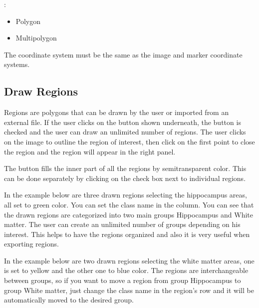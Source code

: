 \documentclass[letterpaper,10pt,english,openany,oneside]{sphinxmanual}
\begin{document}
\sphinxAtStartPar
{}:
\begin{itemize}
\item {} 
\sphinxAtStartPar
Polygon

\item {} 
\sphinxAtStartPar
Multipolygon

\end{itemize}

\sphinxAtStartPar
The coordinate system must be the same as the image and marker coordinate systems.


\subsection{Draw Regions}
\label{\detokenize{docs/starting/regions:draw-regions}}
\sphinxAtStartPar
Regions are polygons that can be drawn by the user or imported from an external file. If the user clicks on the button  shown underneath, the button is checked and the user can draw an unlimited number of regions. The user clicks on the image to outline the region of interest, then click on the first point to close the region and the region will appear in the right panel.

\sphinxAtStartPar
The button  fills the inner part of all the regions by semitransparent color. This can be done separately by clicking on the check box next to individual regions.

\sphinxAtStartPar
{}

\sphinxAtStartPar
In the example below are three drawn regions selecting the hippocampus areas, all set to green color. You can set the class name in the  column. You can see that the drawn regions are categorized into two main groups Hippocampus and White matter. The user can create an unlimited number of groups depending on his interest. This helps to have the regions organized and also it is very useful when exporting regions.

\sphinxAtStartPar
{}

\sphinxAtStartPar
In the example below are two drawn regions selecting the white matter areas, one is set to yellow and the other one to blue color. The regions are interchangeable between groups, so if you want to move a region from group Hippocampus to group White matter, just change the class name in the region’s row and it will be automatically moved to the desired group.
\end{document}
